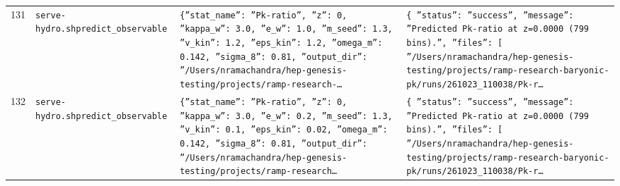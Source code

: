\documentclass[11pt,a4paper]{article}
\begin{document}
\begin{longtable}{@{}p{}p{}p{}p{}@{}}
131 & \texttt{serve-hydro.sh}\newline\texttt{predict\_\allowbreak{}observable} & \texttt{\{''stat\_\allowbreak{}name'':\allowbreak{} ''Pk-ratio'',\allowbreak{} ''z'':\allowbreak{} 0,\allowbreak{} ''kappa\_\allowbreak{}w'':\allowbreak{} 3.0,\allowbreak{} ''e\_\allowbreak{}w'':\allowbreak{} 1.0,\allowbreak{} ''m\_\allowbreak{}seed'':\allowbreak{} 1.3,\allowbreak{} ''v\_\allowbreak{}kin'':\allowbreak{} 1.2,\allowbreak{} ''eps\_\allowbreak{}kin'':\allowbreak{} 1.2,\allowbreak{} ''omega\_\allowbreak{}m'':\allowbreak{} 0.142,\allowbreak{} ''sigma\_\allowbreak{}8'':\allowbreak{} 0.81,\allowbreak{} ''output\_\allowbreak{}dir'':\allowbreak{} ''/\allowbreak{}Users/\allowbreak{}nramachandra/\allowbreak{}hep-genesis-testing/\allowbreak{}projects/\allowbreak{}ramp-research-\ldots{}\allowbreak{}} & \texttt{\{   ''status'':\allowbreak{} ''success'',\allowbreak{}   ''message'':\allowbreak{} ''Predicted Pk-ratio at z=\allowbreak{}0.0000 (799 bins)\allowbreak{}.'',\allowbreak{}   ''files'':\allowbreak{} [     ''/\allowbreak{}Users/\allowbreak{}nramachandra/\allowbreak{}hep-genesis-testing/\allowbreak{}projects/\allowbreak{}ramp-research-baryonic-pk/\allowbreak{}runs/\allowbreak{}261023\_\allowbreak{}110038/\allowbreak{}Pk-r\ldots{}\allowbreak{}} \\
132 & \texttt{serve-hydro.sh}\newline\texttt{predict\_\allowbreak{}observable} & \texttt{\{''stat\_\allowbreak{}name'':\allowbreak{} ''Pk-ratio'',\allowbreak{} ''z'':\allowbreak{} 0,\allowbreak{} ''kappa\_\allowbreak{}w'':\allowbreak{} 3.0,\allowbreak{} ''e\_\allowbreak{}w'':\allowbreak{} 0.2,\allowbreak{} ''m\_\allowbreak{}seed'':\allowbreak{} 1.3,\allowbreak{} ''v\_\allowbreak{}kin'':\allowbreak{} 0.1,\allowbreak{} ''eps\_\allowbreak{}kin'':\allowbreak{} 0.02,\allowbreak{} ''omega\_\allowbreak{}m'':\allowbreak{} 0.142,\allowbreak{} ''sigma\_\allowbreak{}8'':\allowbreak{} 0.81,\allowbreak{} ''output\_\allowbreak{}dir'':\allowbreak{} ''/\allowbreak{}Users/\allowbreak{}nramachandra/\allowbreak{}hep-genesis-testing/\allowbreak{}projects/\allowbreak{}ramp-research\ldots{}\allowbreak{}} & \texttt{\{   ''status'':\allowbreak{} ''success'',\allowbreak{}   ''message'':\allowbreak{} ''Predicted Pk-ratio at z=\allowbreak{}0.0000 (799 bins)\allowbreak{}.'',\allowbreak{}   ''files'':\allowbreak{} [     ''/\allowbreak{}Users/\allowbreak{}nramachandra/\allowbreak{}hep-genesis-testing/\allowbreak{}projects/\allowbreak{}ramp-research-baryonic-pk/\allowbreak{}runs/\allowbreak{}261023\_\allowbreak{}110038/\allowbreak{}Pk-r\ldots{}\allowbreak{}} \\

\end{longtable}
\end{document}
